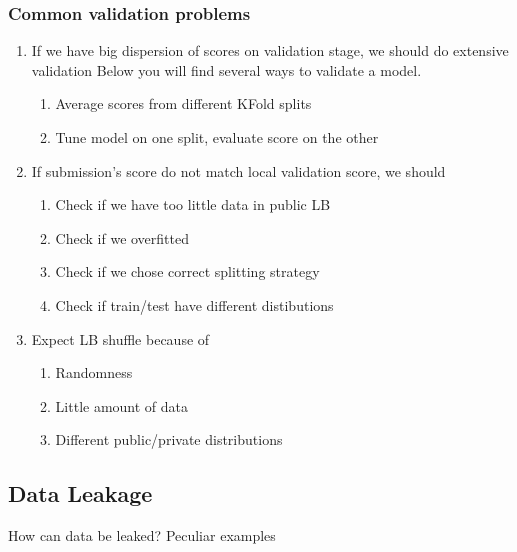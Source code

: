 \documentclass[11pt, twoside]{article}   	%
\begin{document}
\subsubsection{Common validation problems}
\begin{enumerate}
   \item If we have big dispersion of scores on validation stage,
we should do extensive validation
Below you will find several ways to validate a model.
    \begin{enumerate}
      \item Average scores from different KFold splits
      \item Tune model on one split, evaluate score on the other
     \end{enumerate}
   \item If submission’s score do not match local validation score,
we should
    \begin{enumerate}
      \item Check if we have too little data in public LB
      \item Check if we overfitted
      \item Check if we chose correct splitting strategy
      \item Check if train/test have different distibutions
     \end{enumerate}
   \item Expect LB shuffle because of
       \begin{enumerate}
      \item Randomness
      \item Little amount of data
      \item Different public/private distributions
       \end{enumerate}
   \end{enumerate}

\subsection{Data Leakage}
\textup{How can data be leaked? }
\textup{Peculiar examples}
\end{document}
